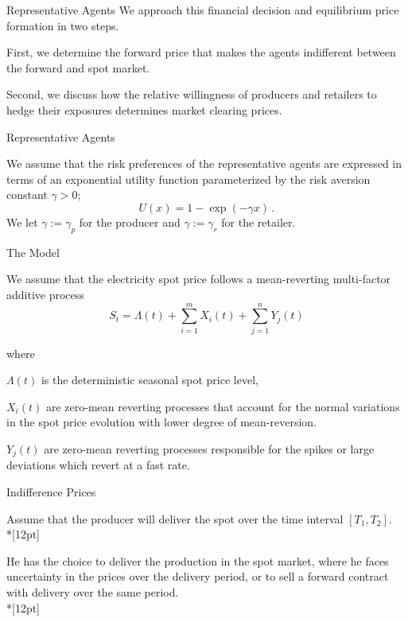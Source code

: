 {Representative Agents}
We approach this financial decision and
equilibrium price formation in two steps.

\item<1-> First, we determine the
forward price that makes the agents indifferent between the forward
and spot market.
\item<2-> Second, we discuss how the relative willingness
of producers and retailers to hedge their exposures determines
market clearing prices.

{Representative Agents}

We assume that the risk preferences of the representative agents are
expressed in terms of an exponential utility function parameterized
by the risk aversion constant $\gamma>0$;
$$
U(x)=1-\exp(-\gamma x)\,.
$$
We let $\gamma:=\gamma_p$ for the producer and $\gamma:=\gamma_r$
for the retailer.

{The Model}
\item<1->
We assume that the electricity spot price follows a
mean-reverting multi-factor additive process
\begin{equation}\label{equation for additive stock price}
S_t=\Lambda(t)+\sum_{i=1}^mX_i(t)+\sum_{j=1}^nY_j(t)
\end{equation}
\item<2->
where
\item $\Lambda(t)$ is the deterministic seasonal spot price level,
\item $X_i(t)$ are zero-mean reverting processes that account for the normal
variations in the spot price evolution with lower degree of
mean-reversion.
\item $Y_j(t)$ are
zero-mean reverting processes responsible for the spikes or large
deviations which revert at a fast rate.

{Indifference Prices}

Assume that the producer will deliver the spot over the time
interval $[T_1,T_2]$.\\*[12pt]

He has the choice to deliver the production in
the spot market, where he faces uncertainty in the prices over the
delivery period, or to sell a forward contract with delivery over
the same period.\\*[12pt]

